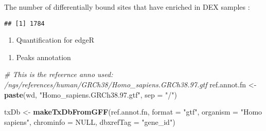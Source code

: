 \documentclass[
]{article}
\newenvironment{Shaded}{\begin{snugshade}}{\end{snugshade}}
\newcommand{\CommentTok}[1]{\textcolor[rgb]{0.56,0.35,0.01}{\textit{#1}}}
\newcommand{\DataTypeTok}[1]{\textcolor[rgb]{0.13,0.29,0.53}{#1}}
\newcommand{\DecValTok}[1]{\textcolor[rgb]{0.00,0.00,0.81}{#1}}
\newcommand{\KeywordTok}[1]{\textcolor[rgb]{0.13,0.29,0.53}{\textbf{#1}}}
\newcommand{\NormalTok}[1]{#1}
\newcommand{\OperatorTok}[1]{\textcolor[rgb]{0.81,0.36,0.00}{\textbf{#1}}}
\newcommand{\OtherTok}[1]{\textcolor[rgb]{0.56,0.35,0.01}{#1}}
\newcommand{\StringTok}[1]{\textcolor[rgb]{0.31,0.60,0.02}{#1}}
\providecommand{\tightlist}{%
  \setlength{\itemsep}{0pt}\setlength{\parskip}{0pt}}
\begin{document}
The number of differentially bound sites that have enriched in DEX
samples :

\begin{Shaded}
\end{Shaded}

\begin{verbatim}
## [1] 1784
\end{verbatim}

\begin{enumerate}
\def\labelenumi{\arabic{enumi}.}
\setcounter{enumi}{9}
\tightlist
\item
  Quantification for edgeR
\end{enumerate}

\begin{Shaded}
\end{Shaded}

\begin{enumerate}
\def\labelenumi{\arabic{enumi}.}
\setcounter{enumi}{10}
\tightlist
\item
  Peaks annotation
\end{enumerate}

\begin{Shaded}
\begin{Highlighting}[]
\CommentTok{#  This is the refeernce anno used: /ngs/references/human/GRCh38/Homo_sapiens.GRCh38.97.gtf}
\NormalTok{ref.annot.fn <-}\StringTok{ }\KeywordTok{paste}\NormalTok{(wd, }\StringTok{"Homo_sapiens.GRCh38.97.gtf"}\NormalTok{, }\DataTypeTok{sep =} \StringTok{"/"}\NormalTok{)}

\NormalTok{txDb <-}\StringTok{ }\KeywordTok{makeTxDbFromGFF}\NormalTok{(ref.annot.fn, }\DataTypeTok{format =} \StringTok{"gtf"}\NormalTok{,}
                           \DataTypeTok{organism =} \StringTok{"Homo sapiens"}\NormalTok{,}
                           \DataTypeTok{chrominfo =} \OtherTok{NULL}\NormalTok{,}
                           \DataTypeTok{dbxrefTag =} \StringTok{"gene_id"}\NormalTok{)}
\end{Highlighting}
\end{Shaded}
\end{document}
